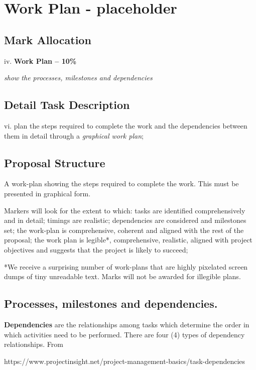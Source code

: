 \section{Work Plan - placeholder}

\subsection{Mark Allocation}

iv. \textbf{Work Plan -- 10\%}

\textit{show the processes, milestones and dependencies}

\subsection{Detail Task Description} 

vi. plan the steps required to complete the work and the dependencies between them in detail through a \textit{graphical work plan};

\subsection{Proposal Structure}

A work-plan showing the steps required to complete the work. This must be presented in graphical form.

Markers will look for the extent to which: tasks are identified comprehensively and in detail; timings are realistic; dependencies are considered and milestones set; the work-plan is comprehensive, coherent and aligned with the rest of the proposal; the work plan is legible*, comprehensive, realistic, aligned with project objectives and suggests that the project is likely to succeed;

*We receive a surprising number of work-plans that are highly pixelated screen dumps of tiny unreadable text. Marks will not be awarded for illegible plans.

\subsection{Processes, milestones and dependencies.}

\textbf{Dependencies} are the relationships among tasks which determine the order in which activities need to be performed. There are four (4) types of dependency relationships. From  

https://www.projectinsight.net/project-management-basics/task-dependencies

